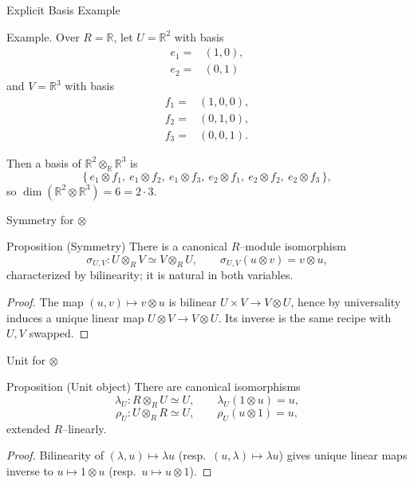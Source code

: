 \begin{frame}{Explicit Basis Example}
\begin{block}{Example.}
Over $R=\mathbb{R}$, let $U=\mathbb{R}^2$ with basis
\vspace{-0.3cm}
\begin{align*}
    e_1=&(1,0),\\
    e_2=&(0,1)
\end{align*}
and $V=\mathbb{R}^3$ with basis
\vspace{-0.4cm}
\begin{align*}
    f_1 = &(1,0,0),\\ f_2 = &(0,1,0),\\ f_3 = &(0,0,1).
\end{align*}

Then a basis of $\mathbb{R}^2\otimes_{\mathbb{R}} \mathbb{R}^3$ is
\vspace{-0.2cm}
\[
\{\,e_1\otimes f_1,\ e_1\otimes f_2,\ e_1\otimes f_3,\ e_2\otimes f_1,\ e_2\otimes f_2,\ e_2\otimes f_3\,\},
\]
so $\dim(\mathbb{R}^2\otimes \mathbb{R}^3)=6=2\cdot 3$.

\end{block}

\end{frame}


\begin{frame}{Symmetry for $\otimes$}
\begin{block}{Proposition (Symmetry)}
There is a canonical $R$–module isomorphism
\[
\sigma_{U,V}: U\otimes_R V \simeq V\otimes_R U,\qquad \sigma_{U,V}(u\otimes v)=v\otimes u,
\]
characterized by bilinearity; it is natural in both variables.
\end{block}
\begin{proof}
The map $(u,v)\mapsto v\otimes u$ is bilinear $U\times V\to V\otimes U$, hence by universality induces a unique linear map $U\otimes V\to V\otimes U$. Its inverse is the same recipe with $U,V$ swapped.
\end{proof}

\end{frame}

\begin{frame}{Unit for $\otimes$}

\begin{block}{Proposition (Unit object)}
There are canonical isomorphisms
\[
\lambda_U: R\otimes_R U \simeq U,\qquad \lambda_U(1\otimes u)=u,
\]
\[
\rho_U: U\otimes_R R \simeq U,\qquad \rho_U(u\otimes 1)=u,
\]
extended $R$–linearly.
\end{block}
\begin{proof}
Bilinearity of $(\lambda,u)\mapsto \lambda u$ (resp.\ $(u,\lambda)\mapsto \lambda u$) gives unique linear maps inverse to $u\mapsto 1\otimes u$ (resp.\ $u\mapsto u\otimes 1$).
\end{proof}
\end{frame}


